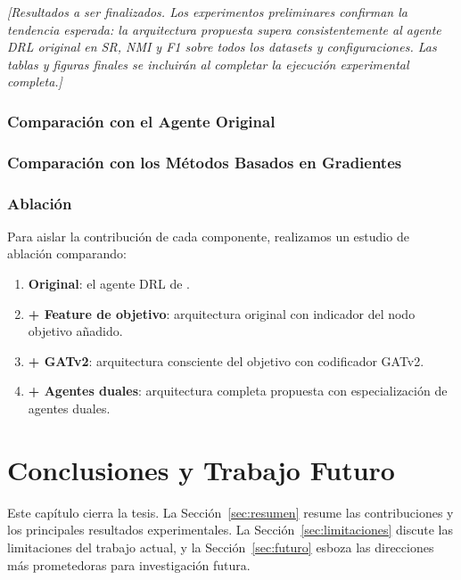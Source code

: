 \documentclass[11pt,a4paper,twoside]{tesis}
\begin{document}
\noindent\textit{[Resultados a ser finalizados. Los experimentos preliminares confirman
la tendencia esperada: la arquitectura propuesta supera consistentemente al agente DRL
original en SR, NMI y F1 sobre todos los datasets y configuraciones. Las tablas y
figuras finales se incluirán al completar la ejecución experimental completa.]}

\subsection{Comparación con el Agente Original}

\subsection{Comparación con los Métodos Basados en Gradientes}

\subsection{Ablación}

Para aislar la contribución de cada componente, realizamos un estudio de ablación
comparando:
\begin{enumerate}
    \item \textbf{Original}: el agente DRL de \textcite{bernini-2024}.
    \item \textbf{+ Feature de objetivo}: arquitectura original con indicador del nodo
          objetivo añadido.
    \item \textbf{+ GATv2}: arquitectura consciente del objetivo con codificador GATv2.
    \item \textbf{+ Agentes duales}: arquitectura completa propuesta con especialización
          de agentes duales.
\end{enumerate}


\chapter{Conclusiones y Trabajo Futuro}
\label{ch:conclusions}

Este capítulo cierra la tesis. La Sección~\ref{sec:resumen} resume las contribuciones
y los principales resultados experimentales. La Sección~\ref{sec:limitaciones} discute
las limitaciones del trabajo actual, y la Sección~\ref{sec:futuro} esboza las
direcciones más prometedoras para investigación futura.
\end{document}
